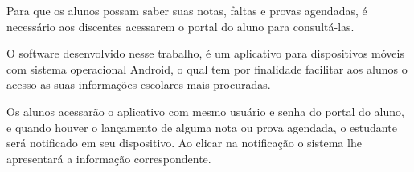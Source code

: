 
	\par Para que os alunos possam saber suas notas, faltas e provas agendadas,
é necessário aos discentes acessarem o portal do aluno para consultá-las.

	\par O software desenvolvido nesse trabalho, é um aplicativo para
dispositivos móveis com sistema operacional Android, o qual tem por
finalidade facilitar aos alunos o acesso as suas informações escolares mais
procuradas.
	
	\par Os alunos acessarão o aplicativo com mesmo usuário e senha do
portal do aluno, e quando houver o lançamento de alguma nota ou prova agendada,
o estudante será notificado em seu dispositivo. Ao clicar na notificação
o sistema lhe apresentará a informação correspondente. 